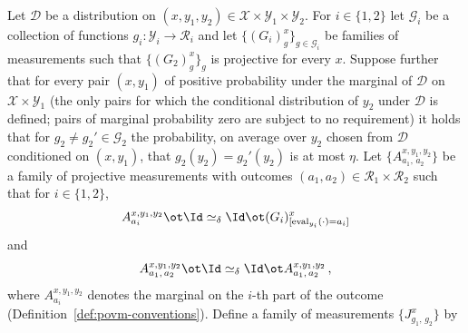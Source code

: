 \begin{lemma}\label{lem:pasting}
	\leanok
	Let $\mathcal D$ be a distribution on $(x, y_1, y_2) \in \mathcal X \times \mathcal Y_1 \times \mathcal Y_2$. For $i \in \{1,2\}$ let $\mathcal G_i$ be a collection of functions $g_i \colon \mathcal Y_i \to \mathcal R_i$ and let $\{(G_i)^x_g\}_{g \in \mathcal G_i}$ be families of measurements such that $\{(G_2)^x_g\}_g$ is projective for every $x$. Suppose further that for every pair $(x, y_1)$ of positive probability under the marginal of $\mathcal D$ on $\mathcal X \times \mathcal Y_1$ (the only pairs for which the conditional distribution of $y_2$ under $\mathcal D$ is defined; pairs of marginal probability zero are subject to no requirement) it holds that for $g_2 \ne g_2' \in \mathcal G_2$ the probability, on average over $y_2$ chosen from $\mathcal D$ conditioned on $(x, y_1)$, that $g_2(y_2) = g_2'(y_2)$ is at most $\eta$. Let $\{A^{x,y_1,y_2}_{a_1,\,a_2}\}$ be a family of projective measurements with outcomes $(a_1, a_2) \in \mathcal R_1 \times \mathcal R_2$ such that for $i \in \{1,2\}$,
	\begin{equation}\label{eq:pasting-1}
		A^{x,y_1,y_2}_{a_i} \ot \Id \simeq_\delta \Id \ot (G_i)^x_{[\operatorname{eval}_{y_i}(\cdot)=a_i]}
	\end{equation}
	and
	\begin{equation}\label{eq:pasting-2}
		A^{x,y_1,y_2}_{a_1,\,a_2} \ot \Id \simeq_\delta \Id \ot A^{x,y_1,y_2}_{a_1,\,a_2}\,,
	\end{equation}
	where $A^{x,y_1,y_2}_{a_i}$ denotes the marginal on the $i$-th part of the outcome (Definition~\ref{def:povm-conventions}). Define a family of measurements $\{J^x_{g_1,\,g_2}\}$ by

\end{lemma}
